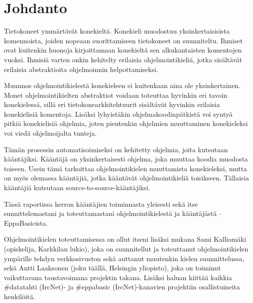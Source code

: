 
\section{Johdanto}
Tietokoneet ymmärtävät konekieltä.
Konekieli muodostuu yksinkertaisisista komennoista,
joiden nopeaan suorittamiseen tietokoneet on suunniteltu.
Ihmiset ovat kuitenkin huonoja kirjoittamaan konekieltä
sen alkukantaisten komentojen vuoksi.
Ihmisiä varten onkin kehitelty erilaisia ohjelmointikieliä,
jotka sisältävät erilaisia abstraktioita ohjelmoinnin helpottamiseksi.

Muunnos ohjelmointikielestä konekieleen ei kuitenkaan aina ole yksinkertainen.
Monet ohjelmointikielten abstraktiot voidaan toteuttaa hyvinkin eri tavoin konekielessä,
sillä eri tietokonearkkitehtuurit sisältävät hyvinkin erilaisia konekielisiä komentoja.
Lisäksi lyhyistäkin ohjelmakoodinpätkistä voi syntyä pitkiä konekielisiä ohjelmia,
joten pientenkin ohjelmien muuttaminen konekieleksi voi viedä ohjelmoijalta tunteja.

Tämän prosessin automatisoimiseksi on kehitetty ohjelmia, joita kutsutaan kääntäjiksi.
Kääntäjä on yksinkertaisesti ohjelma, joka muuttaa koodia muodosta toiseen.
Usein tämä tarkoittaa ohjelmointikielen muuttamista konekieleksi,
mutta on myös olemassa kääntäjiä,
jotka kääntävät ohjelmointikieliä toisikseen.
Tällaisia kääntäjiä kutsutaan source-to-source-kääntäjiksi.

Tässä raportissa kerron kääntäjien toiminnasta yleisesti
sekä itse sunnittelemastani ja toteuttamastani ohjelmointikielestä ja kääntäjästä -- EppaBasicista.

Ohjelmointikielen toteuttamisessa on ollut itseni lisäksi mukana
Sami Kalliomäki (opiskelija, Karkkilan lukio),
joka on suunnitellut ja toteuttanut ohjelmointikielen ympärille tehdyn verkkosivuston
sekä auttanut muutenkin kielen suunnittelussa,
sekä Antti Laaksonen (joku täällä, Helsingin yliopisto),
joka on toiminut vaikuttavana taustavoimana projektin takana.
Lisäksi haluan kiittää kaikkia \#datatahti (IrcNet)- ja \#eppabasic (IrcNet)-kanavien projektiin osallistuineita henkilöitä.

%
